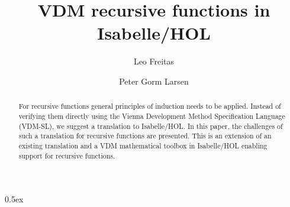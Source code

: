 \documentclass[runningheads,a4paper]{llncs}
\begin{document}
\title{VDM recursive functions in Isabelle/HOL}
\author{Leo Freitas \and Peter Gorm Larsen}

\authorrunning{ }

			
\maketitle
\setcounter{footnote}{0} 
\begin{abstract}
For recursive functions general principles of induction needs to be applied. Instead of verifying them directly using the Vienna Development Method Specification Language (VDM-SL), we suggest a translation to Isabelle/HOL. In this paper, the challenges of such a translation for recursive functions are presented. This is an extension of an existing translation and a VDM mathematical toolbox in Isabelle/HOL enabling support for recursive functions.
\end{abstract}



\parindent 0pt\parskip 0.5ex




 
\end{document}
